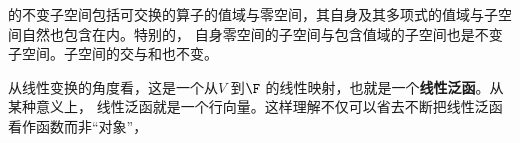 的不变子空间包括可交换的算子的值域与零空间，其自身及其多项式的值域与子空间自然也包含在内。特别的，
自身零空间的子空间与包含值域的子空间也是不变子空间。子空间的交与和也不变。

从线性变换的角度看，这是一个从\(V\) 到\(\F\) 的线性映射，也就是一个\textbf{线性泛函}。从某种意义上，
线性泛函就是一个行向量。这样理解不仅可以省去不断把线性泛函看作函数而非``对象''，
